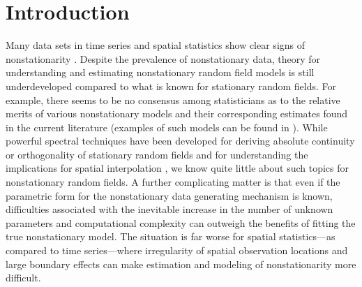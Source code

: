 \documentclass[10pt,noinfoline]{imsart}
\begin{document}
\tableofcontents


\section{Introduction}


Many data sets in time series and spatial statistics show clear signs of nonstationarity \cite{sampson2010constructions,fuglstad2015does}. 
Despite the prevalence of nonstationary data, theory for understanding and estimating nonstationary random field models is still underdeveloped compared to what is known for stationary random fields. For example, there seems to be no consensus among statisticians as to the relative merits of various nonstationary models and their corresponding estimates found in the current literature (examples of such models can be found in \cite{hsing2016local,sampson1992nonparametric,paciorek2006spatial,fuglstad2015exploring}). While powerful spectral techniques have been developed for deriving absolute continuity or orthogonality of stationary random fields \cite{ibragimov2012gaussian} and for understanding the implications for spatial interpolation \cite{stein2012interpolation}, we know quite little about such topics for nonstationary random fields.  A further complicating matter is that even if the parametric form for the nonstationary data generating mechanism is known, difficulties associated with the inevitable increase in the number of unknown parameters and computational complexity can outweigh the benefits of fitting the true nonstationary model. The situation is far worse for spatial statistics---as compared to time series---where irregularity of spatial observation locations and large boundary effects can make estimation and modeling of nonstationarity more difficult. 
\end{document}
